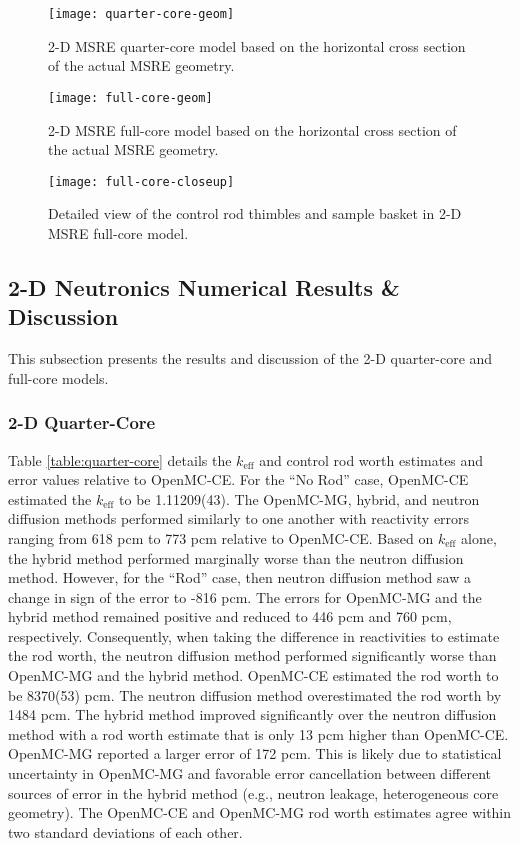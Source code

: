\begin{figure}[h!]
  \centering
  \texttt{[image: quarter-core-geom]}
  \caption{2-D \gls{MSRE} quarter-core model based on the horizontal cross section of the actual
  \gls{MSRE} geometry.}
  \label{fig:1/4-geom}
\end{figure}

\begin{figure}[p]
  \centering
  \texttt{[image: full-core-geom]}
  \caption{2-D \gls{MSRE} full-core model based on the horizontal cross section of the actual
  \gls{MSRE} geometry.}
  \label{fig:full-geom}
\end{figure}

\begin{figure}[p]
  \centering
  \texttt{[image: full-core-closeup]}
  \caption{Detailed view of the control rod thimbles and sample basket in 2-D \gls{MSRE} full-core
    model.}
  \label{fig:full-geom-closeup}
\end{figure}

\FloatBarrier

\subsection{2-D Neutronics Numerical Results \& Discussion} \label{sec:2d-nts-results}

This subsection presents the results and discussion of the 2-D quarter-core and full-core models.

\subsubsection{2-D Quarter-Core}

Table \ref{table:quarter-core} details the $k_\text{eff}$ and control rod worth estimates and error
values relative to OpenMC-CE. For the ``No Rod'' case, OpenMC-CE estimated the $k_\text{eff}$ to be
1.11209(43). The OpenMC-MG, hybrid, and neutron diffusion methods performed
similarly to one another with reactivity errors ranging from 618 pcm to 773 pcm relative to
OpenMC-CE. Based on $k_\text{eff}$ alone, the hybrid method performed marginally worse than the
neutron diffusion method. However, for the ``Rod'' case, then neutron diffusion method saw a
change in sign of the error to -816 pcm. The errors for OpenMC-MG and the hybrid method
remained positive and reduced to 446 pcm and 760 pcm, respectively. Consequently, when taking the
difference in reactivities to estimate the rod worth, the neutron diffusion method performed
significantly worse than OpenMC-MG and the hybrid method. OpenMC-CE estimated the rod worth to be
8370(53) pcm. The neutron diffusion method overestimated the rod worth by 1484 pcm. The hybrid
method improved significantly over the neutron diffusion method with a rod worth estimate that is
only 13 pcm higher than OpenMC-CE. OpenMC-MG reported a larger error of 172 pcm. This is likely due
to statistical uncertainty in OpenMC-MG and favorable error cancellation between different sources
of error in the hybrid method (e.g., neutron leakage, heterogeneous core geometry).
The OpenMC-CE and OpenMC-MG rod worth estimates agree within two standard deviations of each other.


